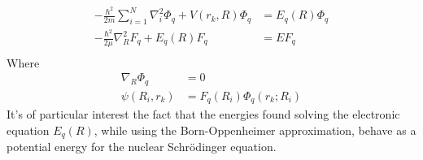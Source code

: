 \documentclass[a4paper, 11pt]{book}
\newcommand{\1}{\opr{\mathds{1}}}
\theoremstyle{plain}
\begin{document}
	\begin{equation*}
		\begin{aligned}
			-\frac{\hbar^2}{2m}\sum_{i=1}^N\nabla_i^2\Phi_q+V(r_k,R)\Phi_q&=E_q(R)\Phi_q\\
			-\frac{\hbar^2}{2\mu}\nabla_R^2F_q+E_q(R)F_q&=EF_q\\
		\end{aligned}
		\label{eq:bornoppenheimerlist}
	\end{equation*}
	Where
	\begin{equation*}
		\begin{aligned}
			\nabla_R\Phi_q&=0\\
			\psi(R_i,r_k)&=F_q(R_i)\Phi_q(r_k;R_i)
		\end{aligned}
	\end{equation*}
	It's of particular interest the fact that the energies found solving the electronic equation $E_q(R)$, while using the Born-Oppenheimer approximation, behave as a potential energy for the nuclear Schrödinger equation.
\end{document}
